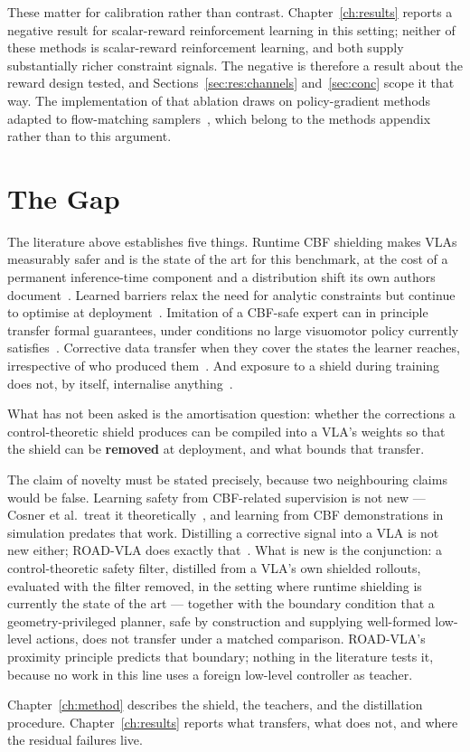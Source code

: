 These matter for calibration rather than contrast. Chapter~\ref{ch:results} reports a negative
result for scalar-reward reinforcement learning in this setting; neither of these methods is
scalar-reward reinforcement learning, and both supply substantially richer constraint signals. The
negative is therefore a result about the reward design tested, and
Sections~\ref{sec:res:channels} and~\ref{sec:conc} scope it that way. The implementation of that
ablation draws on policy-gradient methods adapted to flow-matching
samplers~\cite{liu2025flowgrpo,shao2024grpo}, which belong to the methods appendix rather than to
this argument.

\section{The Gap}\label{sec:bg:gap}

The literature above establishes five things. Runtime CBF shielding makes VLAs measurably safer and
is the state of the art for this benchmark, at the cost of a permanent inference-time component and
a distribution shift its own authors document~\cite{vlsa2026}. Learned barriers relax the need for
analytic constraints but continue to optimise at
deployment~\cite{meng2024conbat,sun2025lpb}. Imitation of a CBF-safe expert can in principle
transfer formal guarantees, under conditions no large visuomotor policy currently
satisfies~\cite{cosner2022il_cbf}. Corrective data transfer when they cover the states the learner
reaches, irrespective of who produced
them~\cite{ciftci2025safegil,hoque2024intervengen,wang2026roadvla}. And exposure to a shield during
training does not, by itself, internalise anything~\cite{guerrier2025guardrails}.

What has not been asked is the amortisation question: whether the corrections a control-theoretic
shield produces can be compiled into a VLA's weights so that the shield can be \textbf{removed} at
deployment, and what bounds that transfer.

The claim of novelty must be stated precisely, because two neighbouring claims would be false.
Learning safety from CBF-related supervision is not new --- Cosner et al.\ treat it
theoretically~\cite{cosner2022il_cbf}, and learning from CBF demonstrations in simulation predates
that work. Distilling a corrective signal into a VLA is not new either; ROAD-VLA does exactly
that~\cite{wang2026roadvla}. What is new is the conjunction: a control-theoretic safety filter,
distilled from a VLA's own shielded rollouts, evaluated with the filter removed, in the setting
where runtime shielding is currently the state of the art --- together with the boundary condition
that a geometry-privileged planner, safe by construction and supplying well-formed low-level
actions, does not transfer under a matched comparison. ROAD-VLA's proximity principle predicts that
boundary; nothing in the literature tests it, because no work in this line uses a foreign low-level
controller as teacher.

Chapter~\ref{ch:method} describes the shield, the teachers, and the distillation procedure.
Chapter~\ref{ch:results} reports what transfers, what does not, and where the residual failures
live.
